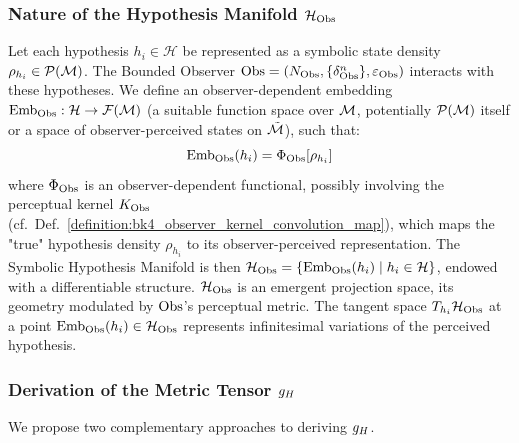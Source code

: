 \subsubsection{Nature of the Hypothesis Manifold \(\mathcal{H}_{\mathrm{Obs}}\)}
\label{subsec:bk8_nature_of_the_hypothesis_manifold}
Let each hypothesis \(h_i \in \mathcal{H}\) be represented as a symbolic state density \(\rho_{h_i} \in \mathcal{P}(\mathcal{M})\). The Bounded Observer \(\mathrm{Obs} = (N_{\mathrm{Obs}}, \{\delta^n_{\mathrm{Obs}}\}, \varepsilon_{\mathrm{Obs}})\) interacts with these hypotheses. We define an observer-dependent embedding \(\text{Emb}_{\mathrm{Obs}}: \mathcal{H} \to \mathcal{F}(\mathcal{M})\) (a suitable function space over \(\mathcal{M}\), potentially \(\mathcal{P}(\mathcal{M})\) itself or a space of observer-perceived states on \(\tilde{\mathcal{M}}\)), such that:
\begin{equation}
\text{Emb}_{\mathrm{Obs}}(h_i) = \Phi_{\mathrm{Obs}}[\rho_{h_i}]
\end{equation}
where \(\Phi_{\mathrm{Obs}}\) is an observer-dependent functional, possibly involving the perceptual kernel \(K_{\mathrm{Obs}}\) (cf.~Def.~\ref{definition:bk4_observer_kernel_convolution_map}), which maps the "true" hypothesis density \(\rho_{h_i}\) to its observer-perceived representation. The Symbolic Hypothesis Manifold is then \(\mathcal{H}_{\mathrm{Obs}} = \{\text{Emb}_{\mathrm{Obs}}(h_i) \mid h_i \in \mathcal{H}\}\), endowed with a differentiable structure. \(\mathcal{H}_{\mathrm{Obs}}\) is an emergent projection space, its geometry modulated by \(\mathrm{Obs}\)'s perceptual metric.
The tangent space \(T_{h_i}\mathcal{H}_{\mathrm{Obs}}\) at a point \(\text{Emb}_{\mathrm{Obs}}(h_i) \in \mathcal{H}_{\mathrm{Obs}}\) represents infinitesimal variations of the perceived hypothesis.
\subsubsection{Derivation of the Metric Tensor \(g_H\)}
\label{subsec:bk8_derivation_of_the_metric_tensor}
We propose two complementary approaches to deriving \(g_H\).
